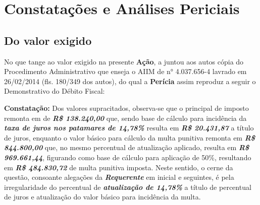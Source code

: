 \hypertarget{3.1}{\section{Constatações e Análises Periciais}}
\subsection{Do valor exigido}
No que tange ao valor exigido na presente \textbf{Ação}, a \reupos juntou aos autos cópia do Procedimento Administrativo que enseja o AIIM de n° 4.037.656-4 lavrado em 26/02/2014 (fls. 180/349 dos autos), do qual a \textbf{Perícia} assim reproduz a seguir o Demonstrativo do Débito Fiscal:
\newline
\hypertarget{tab1}{}
\begin{table}[h!]
    \centering
    \caption{Anexo ao AIIM n° 4.037.656-4 de 26/02/2014 (fl. 182 dos autos)}
    \label{tab:my_label}
\end{table}

\textbf{Constatação:} Dos valores supracitados, observa-se que o principal de imposto remonta em de \emph{\textbf{R\$ 138.240,00}} que, sendo base de cálculo para incidência da \emph{\textbf{taxa de juros nos patamares de 14,78\%}} resulta em \emph{\textbf{R\$ 20.431,87}} a título de juros, enquanto o valor básico para cálculo da multa punitiva remonta em \emph{\textbf{R\$ 844.800,00}} que, no mesmo percentual de atualização aplicado, resulta em \emph{\textbf{R\$ 969.661,44}}, figurando como base de cálculo para aplicação de 50\%, resultando em \emph{\textbf{R\$ 484.830,72}} de multa punitiva imposta. Neste sentido, o cerne da questão, consoante alegações da \emph{\textbf{Requerente}} em inicial e seguintes, é pela irregularidade do percentual de \emph{\textbf{atualização de 14,78\%}} a título de percentual de juros e atualização do valor básico para incidência da multa.

